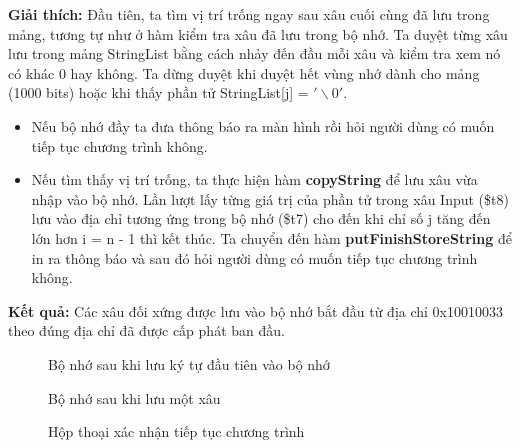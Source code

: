 \documentclass[a4paper,12pt]{article}
\begin{document}
\textbf{Giải thích: } 
Đầu tiên, ta tìm vị trí trống ngay sau xâu cuối cùng đã lưu trong mảng, tương tự như ở hàm kiểm tra xâu đã lưu trong bộ nhớ. Ta duyệt từng xâu lưu trong mảng StringList bằng cách nhảy đến đầu mỗi xâu và kiểm tra xem nó có khác 0 hay không. Ta dừng duyệt khi duyệt hết vùng nhớ dành cho mảng (1000 bits) hoặc khi thấy phần tử StringList[j] = $'\backslash {0}'$.
\begin{itemize}
    \item Nếu bộ nhớ đầy ta đưa thông báo ra màn hình rồi hỏi người dùng có muốn tiếp tục chương trình không.
    \item Nếu tìm thấy vị trí trống, ta thực hiện hàm \textbf{copyString} để lưu xâu vừa nhập vào bộ nhớ. Lần lượt lấy từng giá trị của phần tử trong xâu Input (\$t8) lưu vào địa chỉ tương ứng trong bộ nhớ (\$t7) cho đến khi chỉ số j tăng đến lớn hơn i = n - 1 thì kết thúc. Ta chuyển đến hàm \textbf{putFinishStoreString} để in ra thông báo và sau đó hỏi người dùng có muốn tiếp tục chương trình không.
\end{itemize}  
\clearpage
\noindent
\textbf{Kết quả:} Các xâu đối xứng được lưu vào bộ nhớ bắt đầu từ địa chỉ 0x10010033 theo đúng địa chỉ đã được cấp phát ban đầu.
\begin{figure}[!h]
	\centerline{}
	\caption{Bộ nhớ sau khi lưu ký tự đầu tiên vào bộ nhớ}
	\label{fig:bai6}
\end{figure}
\begin{figure}[!h]
	\centerline{}
	\caption{Bộ nhớ sau khi lưu một xâu}
	\label{fig:bai6}
\end{figure}
\begin{figure}[!h]
	\centerline{}
	\caption{Hộp thoại xác nhận tiếp tục chương trình}
	\label{fig:bai6}
\end{figure}
\end{document}
